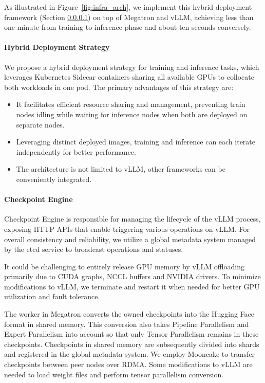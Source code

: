 \documentclass{article}
\begin{document}
As illustrated in Figure~\ref{fig:infra_arch}, we implement this hybrid deployment framework (Section \ref{sec:hybrid_deployment}) on top of Megatron and vLLM, achieving less than one minute from training to inference phase and about ten seconds conversely. 

\paragraph{Hybrid Deployment Strategy}
\label{sec:hybrid_deployment}
We propose a hybrid deployment strategy for training and inference tasks, which leverages Kubernetes Sidecar containers sharing all available GPUs to collocate both workloads in one pod. The primary advantages of this strategy are:

\begin{itemize}
    \item It facilitates efficient resource sharing and management, preventing train nodes idling while waiting for inference nodes when both are deployed on separate nodes.
    \item Leveraging distinct deployed images, training and inference can each iterate independently for better performance. 
    \item The architecture is not limited to vLLM, other frameworks can be conveniently integrated.
\end{itemize}

\paragraph{Checkpoint Engine}
\label{sec:checkpoint_engine}
Checkpoint Engine is responsible for managing the lifecycle of the vLLM process, exposing HTTP APIs that enable triggering various operations on vLLM. For overall consistency and reliability, we utilize a global metadata system managed by the etcd service to broadcast operations and statuses.

It could be challenging to entirely release GPU memory by vLLM offloading primarily due to CUDA graphs, NCCL buffers and NVIDIA drivers. To minimize modifications to vLLM, we terminate and restart it when needed for better GPU utilization and fault tolerance. 

The worker in Megatron converts the owned checkpoints into the Hugging Face format in shared memory. This conversion also takes Pipeline Parallelism and Expert Parallelism into account so that only Tensor Parallelism remains in these checkpoints. Checkpoints in shared memory are subsequently divided into shards and registered in the global metadata system. We employ Mooncake to transfer checkpoints between peer nodes over RDMA. Some modifications to vLLM are needed to load weight files and perform tensor parallelism conversion.
\end{document}
